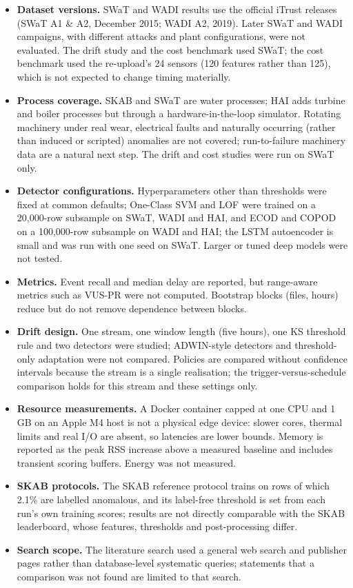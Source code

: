 \documentclass[11pt]{article}
\begin{document}
\begin{itemize}
\item \textbf{Dataset versions.} SWaT and WADI results use the official iTrust releases
(SWaT A1 \& A2, December 2015; WADI A2, 2019). Later SWaT and WADI campaigns, with
different attacks and plant configurations, were not evaluated. The drift study and the
cost benchmark used SWaT; the cost benchmark used the re-upload's 24 sensors (120 features rather than 125), which is
not expected to change timing materially.
\item \textbf{Process coverage.} SKAB and SWaT are water processes; HAI adds
turbine and boiler processes but through a hardware-in-the-loop simulator. Rotating
machinery under real wear, electrical faults and naturally occurring (rather than
induced or scripted) anomalies are not covered; run-to-failure machinery data are a natural
next step. The drift and cost studies were run on SWaT
only.
\item \textbf{Detector configurations.} Hyperparameters other than thresholds were
fixed at common defaults; One-Class SVM and LOF were trained on a 20{,}000-row
subsample on SWaT, WADI and HAI, and ECOD and COPOD on a 100{,}000-row subsample on WADI
and HAI; the LSTM autoencoder is small and was run with one seed on
SWaT. Larger or tuned deep models were not tested.
\item \textbf{Metrics.} Event recall and median delay are reported, but
range-aware metrics such as VUS-PR \citep{paparrizos2022} were not computed.
Bootstrap blocks (files, hours) reduce but do not remove dependence between blocks.
\item \textbf{Drift design.} One stream, one window length (five hours), one KS
threshold rule and two detectors were studied; ADWIN-style detectors and threshold-only
adaptation were not compared. Policies are compared without confidence intervals
because the stream is a single realisation; the trigger-versus-schedule comparison holds
for this stream and these settings only.
\item \textbf{Resource measurements.} A Docker container capped at one CPU and
1\,GB on an Apple M4 host is not a physical edge device: slower cores, thermal
limits and real I/O are absent, so latencies are lower bounds. Memory is reported as the
peak RSS increase above a measured baseline and includes transient scoring buffers. Energy was not measured.
\item \textbf{SKAB protocols.} The SKAB reference protocol trains on rows of which
2.1\% are labelled anomalous, and its label-free threshold is set from each
run's own training scores; results are not directly comparable with the SKAB
leaderboard, whose features, thresholds and post-processing differ.
\item \textbf{Search scope.} The literature search used a general web search and
publisher pages rather than database-level systematic queries; statements that a
comparison was not found are limited to that search.
\end{itemize}
\end{document}
